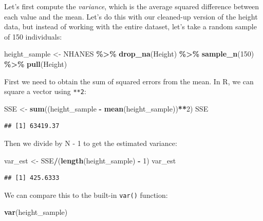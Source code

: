 \documentclass[
  12pt,
]{book}
\newenvironment{Shaded}{\begin{snugshade}}{\end{snugshade}}
\newcommand{\DecValTok}[1]{\textcolor[rgb]{0.00,0.00,0.81}{#1}}
\newcommand{\FunctionTok}[1]{\textcolor[rgb]{0.13,0.29,0.53}{\textbf{#1}}}
\newcommand{\NormalTok}[1]{#1}
\newcommand{\OtherTok}[1]{\textcolor[rgb]{0.56,0.35,0.01}{#1}}
\newcommand{\SpecialCharTok}[1]{\textcolor[rgb]{0.81,0.36,0.00}{\textbf{#1}}}
\begin{document}
Let's first compute the \emph{variance}, which is the average squared difference between each value and the mean. Let's do this with our cleaned-up version of the height data, but instead of working with the entire dataset, let's take a random sample of 150 individuals:

\begin{Shaded}
\begin{Highlighting}[]
\NormalTok{height\_sample }\OtherTok{\textless{}{-}}\NormalTok{ NHANES }\SpecialCharTok{\%\textgreater{}\%}
  \FunctionTok{drop\_na}\NormalTok{(Height) }\SpecialCharTok{\%\textgreater{}\%}
  \FunctionTok{sample\_n}\NormalTok{(}\DecValTok{150}\NormalTok{) }\SpecialCharTok{\%\textgreater{}\%}
  \FunctionTok{pull}\NormalTok{(Height)}
\end{Highlighting}
\end{Shaded}

First we need to obtain the sum of squared errors from the mean. In R, we can square a vector using \texttt{**2}:

\begin{Shaded}
\begin{Highlighting}[]
\NormalTok{SSE }\OtherTok{\textless{}{-}} \FunctionTok{sum}\NormalTok{((height\_sample }\SpecialCharTok{{-}} \FunctionTok{mean}\NormalTok{(height\_sample))}\SpecialCharTok{**}\DecValTok{2}\NormalTok{)}
\NormalTok{SSE}
\end{Highlighting}
\end{Shaded}

\begin{verbatim}
## [1] 63419.37
\end{verbatim}

Then we divide by N - 1 to get the estimated variance:

\begin{Shaded}
\begin{Highlighting}[]
\NormalTok{var\_est }\OtherTok{\textless{}{-}}\NormalTok{ SSE}\SpecialCharTok{/}\NormalTok{(}\FunctionTok{length}\NormalTok{(height\_sample) }\SpecialCharTok{{-}} \DecValTok{1}\NormalTok{)}
\NormalTok{var\_est}
\end{Highlighting}
\end{Shaded}

\begin{verbatim}
## [1] 425.6333
\end{verbatim}

We can compare this to the built-in \texttt{var()} function:

\begin{Shaded}
\begin{Highlighting}[]
\FunctionTok{var}\NormalTok{(height\_sample)}
\end{Highlighting}
\end{Shaded}
\end{document}
